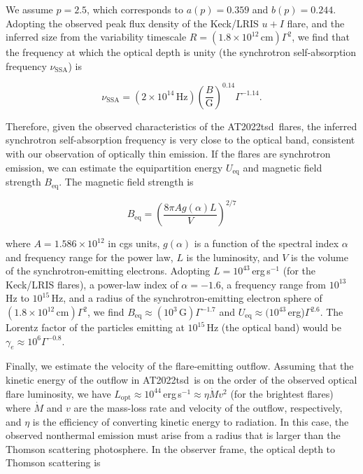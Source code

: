 \documentclass{nature_plusfigure}
\newcommand{\at}{AT2022tsd}
\begin{document}
\begin{methods}
We assume $p=2.5$, which corresponds to\cite{Longair2011} $a(p)=0.359$ and $b(p)=0.244$. Adopting the observed peak flux density of the Keck/LRIS $u+I$ flare, and the inferred size from the variability timescale $R=(1.8\times10^{12}\,\mathrm{cm})\Gamma^2$, we find that the frequency at which the optical depth is unity (the synchrotron self-absorption frequency $\nu_\mathrm{SSA}$) is

\begin{equation}
\label{eq:ssa}
\nu_\mathrm{SSA} = (2\times10^{14}\,\mathrm{Hz}) \left(\frac{B}{\mathrm{G}} \right)^{0.14} \Gamma^{-1.14}.
\end{equation}

\noindent Therefore, given the observed characteristics of the \at\ flares, the inferred synchrotron self-absorption frequency is very close to the optical band, consistent with our observation of optically thin emission.
If the flares are synchrotron emission, we can  
estimate the equipartition energy $U_\mathrm{eq}$ and magnetic field strength $B_\mathrm{eq}$. The magnetic field strength is

\begin{equation}
B_\mathrm{eq} = \left( \frac{8\pi A g(\alpha) L}{V} \right)^{2/7}
\end{equation}

\noindent where $A=1.586\times10^{12}$ in cgs units, $g(\alpha)$ is a function of the spectral index $\alpha$ and frequency range for the power law, $L$ is the luminosity, and $V$ is the volume of the synchrotron-emitting electrons. Adopting $L=10^{43}\,$erg\,s$^{-1}$ (for the Keck/LRIS flares), a power-law index of $\alpha=-1.6$, a frequency range from $10^{13}$\,Hz to $10^{15}$\,Hz, and a radius of the synchrotron-emitting electron sphere of $(1.8\times10^{12}\,\mathrm{cm})\Gamma^2$, we find $B_\mathrm{eq}\approx(10^{3}\,\mathrm{G})\Gamma^{-1.7}$ and $U_\mathrm{eq}\approx(10^{43}\,$erg)$\Gamma^{2.6}$. The Lorentz factor of the particles emitting at $10^{15}$\,Hz (the optical band) would be $\gamma_e\approx10^{6} \Gamma^{-0.8}$.

Finally, we estimate the velocity of the flare-emitting outflow. Assuming that the kinetic energy of the outflow in \at\ is on the order of the observed optical flare luminosity, we have $L_\mathrm{opt} \approx 10^{44}\,$erg\,s$^{-1} \approx \eta \dot{M}v^2$ (for the brightest flares) where $\dot{M}$ and $v$ are the mass-loss rate and velocity of the outflow, respectively, and $\eta$ is the efficiency of converting kinetic energy to radiation. In this case, the observed nonthermal emission must arise from a radius that is larger than the Thomson scattering photosphere. In the observer frame, the optical depth to Thomson scattering is


\end{methods}
\end{document}
